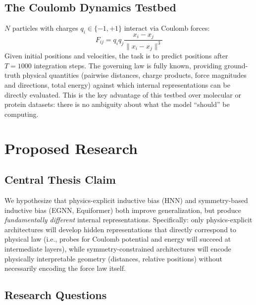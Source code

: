 \documentclass[12pt]{article}
\begin{document}
\subsection{The Coulomb Dynamics Testbed}

$N$ particles with charges $q_i \in \{-1, +1\}$ interact via Coulomb forces: \[
F_{ij} = q_i q_j \frac{x_i - x_j}{\|x_i - x_j\|^3} \] Given initial positions
and velocities, the task is to predict positions after $T = 1000$ integration
steps. The governing law is fully known, providing ground-truth physical
quantities (pairwise distances, charge products, force magnitudes and
directions, total energy) against which internal representations can be
directly evaluated. This is the key advantage of this testbed over molecular or
protein datasets: there is no ambiguity about what the model ``should'' be
computing.

\section{Proposed Research}

\subsection{Central Thesis Claim}

We hypothesize that physics-explicit inductive bias (HNN) and symmetry-based
inductive bias (EGNN, Equiformer) both improve generalization, but produce
\textit{fundamentally different} internal representations. Specifically: only
physics-explicit architectures will develop hidden representations that directly
correspond to physical law (i.e., probes for Coulomb potential and energy will
succeed at intermediate layers), while symmetry-constrained architectures will
encode physically interpretable geometry (distances, relative positions) without
necessarily encoding the force law itself.

\subsection{Research Questions}
\end{document}
